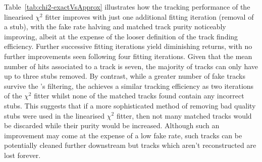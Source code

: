 \begin{table}[htbp]
\label{tab:chi2_iterations}
  \centering
\end{table}

Table~\ref{tab:chi2-exactVsApprox} illustrates how the tracking performance of the linearised $\chi^{2}$ fitter improves with just one additional fitting iteration (removal of a stub), with the fake rate halving and matched track purity noticeably improving, albeit at the expense of the looser definition of the track finding efficiency.
Further successive fitting iterations yield diminishing returns, with no further improvements seen following four fitting iterations.
Given that the mean number of hits associated to a track is seven, the majority of tracks can only have up to three stubs removed.
By contrast, while a greater number of fake tracks survive the \KF's filtering, the \KF achieves a similar tracking efficiency as two iterations of the $\chi^{2}$ fitter whilst none of the matched tracks found contain any incorrect stubs. 
This suggests that if a more sophisticated method of removing bad quality stubs were used in the linearised $\chi^{2}$ fitter, then  not many matched tracks would be discarded while their purity would be increased.
Although such an improvement may come at the expense of a low fake rate, such tracks can be potentially cleaned further downstream but tracks which aren't reconstructed are lost forever.

